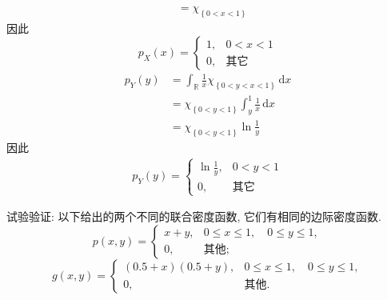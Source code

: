 \documentclass[../main.tex]{subfiles}
\begin{document}
\begin{solution}
\begin{enumerate}
\begin{equation}
\begin{aligned}
                  &= \chi _{\left\{ 0< x< 1 \right\}} 
            \end{aligned}
         \end{equation}因此 \[
         p_{X}\left( x \right)= \begin{cases} 1,&0< x< 1\\ 
          0,&\text{其它} \end{cases}  
         \]
         \begin{equation}
            \begin{aligned}
                p_{Y}\left(y \right)&= \int_{\mathbb{R} }\frac{1 }{x }\chi _{\left\{ 0< y< x< 1 \right\}}\,\mathrm{d} x\\ 
                 &=   \chi _{\left\{ 0< y< 1 \right\}}\int_{y}^{1}\frac{1 }{x }\,\mathrm{d} x\\ 
                  &= \chi _{\left\{ 0< y< 1 \right\}} \ln \frac{1 }{y } 
            \end{aligned}
         \end{equation}因此\begin{equation}
            \begin{aligned}
                p_{Y}\left( y \right)= \begin{cases} \ln \frac{1 }{y },&0< y< 1\\ 
                 0,& \text{其它}  \end{cases}  
            \end{aligned}
         \end{equation}
    \end{enumerate}
    
\end{solution}

\begin{exercise}{}{}
试验验证: 以下给出的两个不同的联合密度函数, 它们有相同的边际密度函数.
\[
p(x,y) = \begin{cases} x+y, & 0 \le x \le 1, \quad 0 \le y \le 1, \\ 0, & \text{其他}; \end{cases}
\]
\[
g(x,y) = \begin{cases} (0.5+x)(0.5+y), & 0 \le x \le 1, \quad 0 \le y \le 1, \\ 0, & \text{其他}. \end{cases}
\]
\end{exercise}
\end{document}
